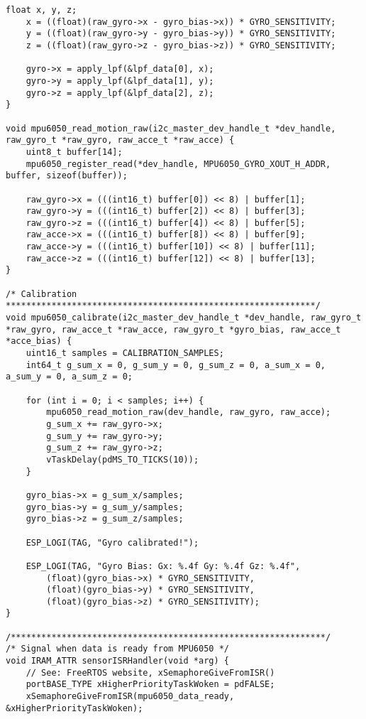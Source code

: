 \begin{lstlisting}[caption={Register Read}]
    float x, y, z; 
    x = ((float)(raw_gyro->x - gyro_bias->x)) * GYRO_SENSITIVITY;
    y = ((float)(raw_gyro->y - gyro_bias->y)) * GYRO_SENSITIVITY;
    z = ((float)(raw_gyro->z - gyro_bias->z)) * GYRO_SENSITIVITY;

    gyro->x = apply_lpf(&lpf_data[0], x);
    gyro->y = apply_lpf(&lpf_data[1], y);
    gyro->z = apply_lpf(&lpf_data[2], z);
}

void mpu6050_read_motion_raw(i2c_master_dev_handle_t *dev_handle, raw_gyro_t *raw_gyro, raw_acce_t *raw_acce) {
    uint8_t buffer[14];
    mpu6050_register_read(*dev_handle, MPU6050_GYRO_XOUT_H_ADDR, buffer, sizeof(buffer));

    raw_gyro->x = (((int16_t) buffer[0]) << 8) | buffer[1];
    raw_gyro->y = (((int16_t) buffer[2]) << 8) | buffer[3];
    raw_gyro->z = (((int16_t) buffer[4]) << 8) | buffer[5];
    raw_acce->x = (((int16_t) buffer[8]) << 8) | buffer[9];
    raw_acce->y = (((int16_t) buffer[10]) << 8) | buffer[11];
    raw_acce->z = (((int16_t) buffer[12]) << 8) | buffer[13];
}

/* Calibration *************************************************************/
void mpu6050_calibrate(i2c_master_dev_handle_t *dev_handle, raw_gyro_t *raw_gyro, raw_acce_t *raw_acce, raw_gyro_t *gyro_bias, raw_acce_t *acce_bias) {
    uint16_t samples = CALIBRATION_SAMPLES;
    int64_t g_sum_x = 0, g_sum_y = 0, g_sum_z = 0, a_sum_x = 0, a_sum_y = 0, a_sum_z = 0;

    for (int i = 0; i < samples; i++) {
        mpu6050_read_motion_raw(dev_handle, raw_gyro, raw_acce);
        g_sum_x += raw_gyro->x;
        g_sum_y += raw_gyro->y;
        g_sum_z += raw_gyro->z;
        vTaskDelay(pdMS_TO_TICKS(10)); 
    }

    gyro_bias->x = g_sum_x/samples;
    gyro_bias->y = g_sum_y/samples;
    gyro_bias->z = g_sum_z/samples;

    ESP_LOGI(TAG, "Gyro calibrated!");

    ESP_LOGI(TAG, "Gyro Bias: Gx: %.4f Gy: %.4f Gz: %.4f",
        (float)(gyro_bias->x) * GYRO_SENSITIVITY,
        (float)(gyro_bias->y) * GYRO_SENSITIVITY,
        (float)(gyro_bias->z) * GYRO_SENSITIVITY);
}

/**************************************************************/
/* Signal when data is ready from MPU6050 */
void IRAM_ATTR sensorISRHandler(void *arg) {
    // See: FreeRTOS website, xSemaphoreGiveFromISR()
    portBASE_TYPE xHigherPriorityTaskWoken = pdFALSE;
    xSemaphoreGiveFromISR(mpu6050_data_ready, &xHigherPriorityTaskWoken);


\end{lstlisting}
